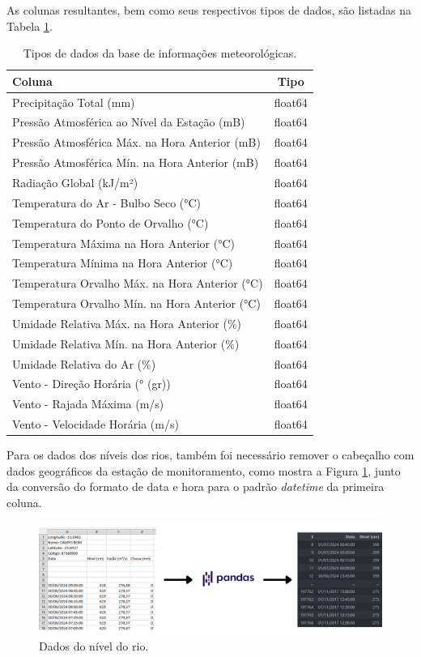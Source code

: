 As colunas resultantes, bem como seus respectivos tipos de dados, são listadas na Tabela \ref{tab:colunas_dados_meteorologicos}.
\begin{table}[H]
	\centering
	\begin{tabular}{|p{10cm}|c|}
	\hline
	\textbf{Coluna} & \textbf{Tipo} \\
	\hline
	Precipitação Total (mm) & float64 \\
	Pressão Atmosférica ao Nível da Estação (mB) & float64 \\
	Pressão Atmosférica Máx. na Hora Anterior (mB) & float64 \\
	Pressão Atmosférica Mín. na Hora Anterior (mB) & float64 \\
	Radiação Global (kJ/m²) & float64 \\
	Temperatura do Ar - Bulbo Seco (°C) & float64 \\
	Temperatura do Ponto de Orvalho (°C) & float64 \\
	Temperatura Máxima na Hora Anterior (°C) & float64 \\
	Temperatura Mínima na Hora Anterior (°C) & float64 \\
	Temperatura Orvalho Máx. na Hora Anterior (°C) & float64 \\
	Temperatura Orvalho Mín. na Hora Anterior (°C) & float64 \\
	Umidade Relativa Máx. na Hora Anterior (\%) & float64 \\
	Umidade Relativa Mín. na Hora Anterior (\%) & float64 \\
	Umidade Relativa do Ar (\%) & float64 \\
	Vento - Direção Horária (° (gr)) & float64 \\
	Vento - Rajada Máxima (m/s) & float64 \\
	Vento - Velocidade Horária (m/s) & float64 \\
	\hline
	\end{tabular}
	\caption{Tipos de dados da base de informações meteorológicas.}
	\label{tab:colunas_dados_meteorologicos}
\end{table}

Para os dados dos níveis dos rios, também foi necessário remover o cabeçalho com dados geográficos da estação de monitoramento, como mostra a Figura \ref{fig:base_sema}, junto da conversão do formato de data e hora para o padrão \textit{datetime} da primeira coluna.

\begin{figure}[H]
	\caption{\label{fig:base_sema}Dados do nível do rio.}
	\begin{center}
		\includegraphics[scale=0.3]{figuras/base_sema.png}
	\end{center}
\end{figure}

